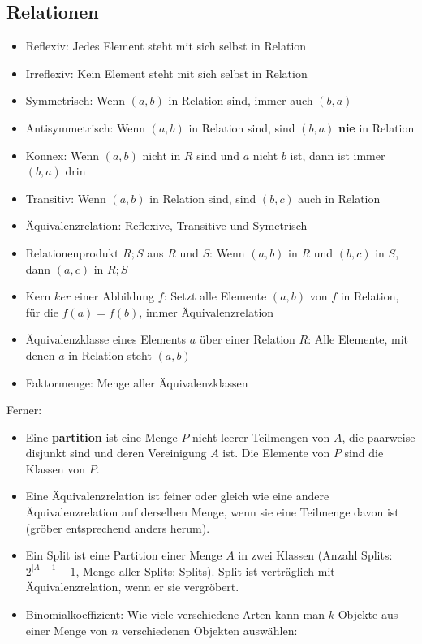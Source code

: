 \documentclass[12pt,landscape]{article}
\begin{document}
\begin{multicols}{3}
\subsection{Relationen}
\begin{itemize}
\item Reflexiv: Jedes Element steht mit sich selbst in Relation
\item Irreflexiv: Kein Element steht mit sich selbst in Relation
\item Symmetrisch: Wenn $(a, b)$ in Relation sind, immer auch $(b, a)$
\item Antisymmetrisch: Wenn $(a, b)$ in Relation sind, sind $(b, a)$ \textbf{nie} in Relation
\item Konnex: Wenn $(a, b)$ nicht in $R$ sind und $a$ nicht $b$ ist, dann ist immer $(b, a)$ drin
\item Transitiv: Wenn $(a, b)$ in Relation sind, sind $(b, c)$ auch in Relation
\item Äquivalenzrelation: Reflexive, Transitive und Symetrisch
\item Relationenprodukt $R;S$ aus $R$ und $S$: Wenn $(a, b)$ in $R$ und $(b, c)$ in $S$, dann $(a, c)$ in $R;S$
\item Kern $ker$ einer Abbildung $f$: Setzt alle Elemente $(a, b)$ von $f$ in Relation, für die $f(a) = f(b)$, immer Äquivalenzrelation
\item Äquivalenzklasse eines Elements $a$ über einer Relation $R$: Alle Elemente, mit denen $a$ in Relation steht $(a, b)$
\item Faktormenge: Menge aller Äquivalenzklassen
\end{itemize}
Ferner:
\begin{itemize}
\item Eine \textbf{partition} ist eine Menge $P$ nicht leerer Teilmengen von $A$, die paarweise disjunkt sind und deren Vereinigung $A$ ist. Die Elemente von $P$ sind die Klassen von $P$.
\item Eine Äquivalenzrelation ist feiner oder gleich wie eine andere Äquivalenzrelation auf derselben Menge, wenn sie eine Teilmenge davon ist (gröber entsprechend anders herum).
\item Ein Split ist eine Partition einer Menge $A$ in zwei Klassen (Anzahl Splits: $2^{|A|-1} - 1$, Menge aller Splits: Splits). Split ist verträglich mit Äquivalenzrelation, wenn er sie vergröbert.
\item Binomialkoeffizient: Wie viele verschiedene Arten kann man $k$ Objekte aus einer Menge von $n$ verschiedenen Objekten auswählen:

\end{itemize}
\end{multicols}
\end{document}
